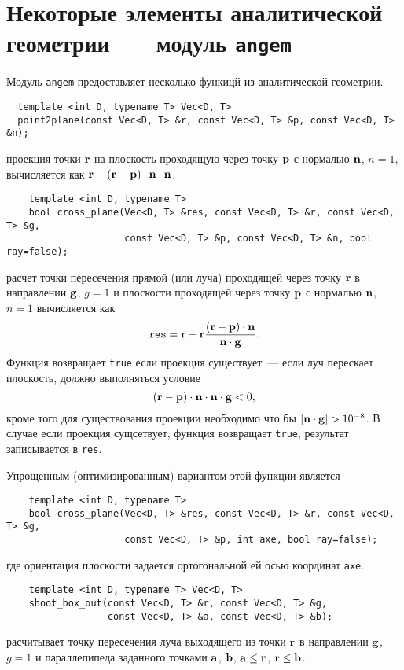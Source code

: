 \section{Некоторые элементы аналитической геометрии~--- модуль {\tt angem}}
\def\r{{\bf r}}
\def\n{{\bf n}}
\def\p{{\bf p}}
\def\g{{\bf g}}
\def\a{{\bf a}}
\def\b{{\bf b}}

Модуль \verb'angem' предоставляет несколько функицй из аналитической геометрии.

\begin{verbatim}
  template <int D, typename T> Vec<D, T>
  point2plane(const Vec<D, T> &r, const Vec<D, T> &p, const Vec<D, T> &n);
\end{verbatim}
проекция точки $\r$ на плоскость проходящую через точку $\p$ с нормалью $\n$, $n=1$, вычисляется как
$\r-(\r-\p)\cdot \n \cdot \n$.

\begin{verbatim}
    template <int D, typename T> 
    bool cross_plane(Vec<D, T> &res, const Vec<D, T> &r, const Vec<D, T> &g,
                     const Vec<D, T> &p, const Vec<D, T> &n, bool ray=false);
\end{verbatim}
расчет точки пересечения прямой (или луча) проходящей через точку $\r$ в направлении $\g$, $g=1$ и плоскости проходящей через точку $\p$ с нормалью $\n$, $n=1$
вычисляется как
$$
{\tt res} = \r - \r\frac{(\r-\p)\cdot\n}{\n\cdot\g}.
$$
Функция возвращает \verb'true' если проекция существует~--- если луч перескает плоскость, должно выполняться условие
$$
(\r-\p)\cdot\n\cdot\n\cdot\g<0,
$$
кроме того для существования проекции необходимо что бы $|\n\cdot\g|>10^{-8}$.
В случае если проекция сущсетвует, функция возвращает \verb'true', результат записывается в \verb'res'.

Упрощенным (оптимизированным) вариантом этой функции является
\begin{verbatim}
    template <int D, typename T> 
    bool cross_plane(Vec<D, T> &res, const Vec<D, T> &r, const Vec<D, T> &g,
				     const Vec<D, T> &p, int axe, bool ray=false);
\end{verbatim}
где ориентация плоскости задается ортогональной ей осью координат \verb'axe'.

\begin{verbatim}
    template <int D, typename T> Vec<D, T> 
    shoot_box_out(const Vec<D, T> &r, const Vec<D, T> &g, 
                  const Vec<D, T> &a, const Vec<D, T> &b);
\end{verbatim}
расчитывает точку пересечения луча выходящего из точки $\r$ в направлении $\g$, $g=1$ и параллепипеда заданного точками $\a$, $\b$, $\a\le\r$, $\r\le\b$.

